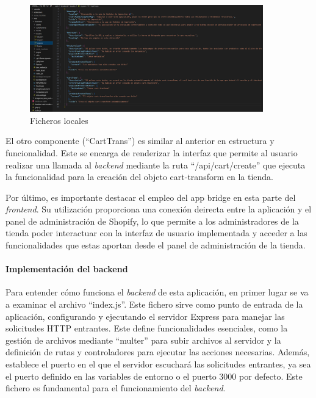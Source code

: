 \documentclass[11pt]{article}
\newcommand{\subsubsubsection}[1]{\paragraph{#1}}
\begin{document}
\begin{figure}[H]
    \centering
    \includegraphics[width=0.9\textwidth]{imagenes-admin/locales-admin.png}
    \caption{\label{fig:localesAdmin} Ficheros locales }
    \vspace{\fill}
\end{figure}

El otro componente (``CartTrans'') es similar al anterior en estructura y funcionalidad. Este se encarga de renderizar la interfaz que permite al usuario realizar una llamada al \textit{backend} mediante
la ruta ``/api/cart/create'' que ejecuta la funcionalidad para la creación del objeto cart-transform en la tienda.

Por último, es importante destacar el empleo del app bridge en esta parte del \textit{frontend}. Su utilización proporciona una conexión deirecta entre la aplicación y el panel 
de administración de Shopify, lo que permite a los administradores de la tienda poder interactuar con la interfaz de usuario implementada y acceder a las funcionalidades que estas aportan
desde el panel de administración de la tienda.


\subsubsubsection{Implementación del backend}

Para entender cómo funciona el \textit{backend} de esta aplicación, en primer lugar se va a examinar el archivo ``index.js''. Este fichero sirve como 
punto de entrada de la aplicación, configurando y ejecutando el servidor Express para manejar las solicitudes HTTP entrantes. Este define funcionalidades
esenciales, como la gestión de archivos mediante ``multer'' para subir archivos al servidor y la definición de rutas y controladores para ejecutar
las acciones necesarias. Además, establece el puerto en el que el servidor escuchará las solicitudes entrantes, ya sea el puerto definido en las 
variables de entorno o el puerto 3000 por defecto. Este fichero es fundamental para el funcionamiento del \textit{backend}.
\end{document}
